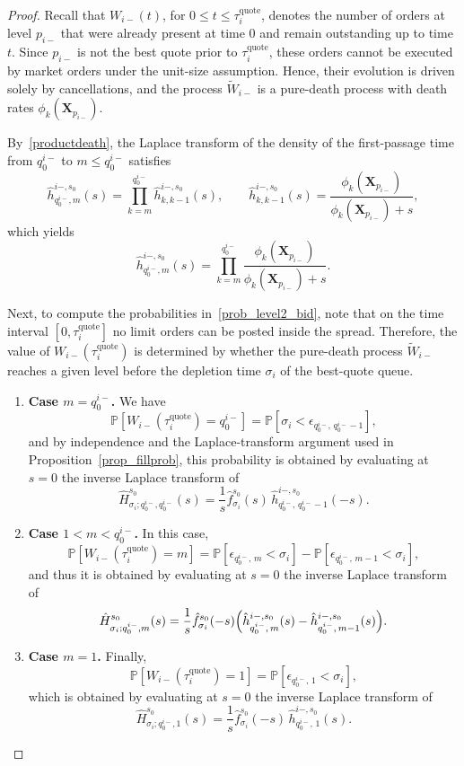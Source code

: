 \documentclass[10pt,a4paper]{amsart}
\begin{document}
\begin{proof}
Recall that $W_{i-}(t)$, for $0\leq t\leq \tau_i^{\text{quote}}$, denotes the number of orders at level $p_{i-}$ that were already present at time $0$ and remain outstanding up to time $t$. Since $p_{i-}$ is not the best quote prior to $\tau_i^{\text{quote}}$, these orders cannot be executed by market orders under the unit-size assumption. Hence, their evolution is driven solely by cancellations, and the process $\tilde{W}_{i-}$ is a pure-death process with death rates $\phi_k(\boldsymbol{X}_{p_{i-}})$.

By~\eqref{productdeath}, the Laplace transform of the density of the first-passage time from $q_0^{i-}$ to $m\leq q_0^{i-}$ satisfies
\[
\hat{h}_{q_0^{i-},m}^{i-,s_0}(s)
=
\prod_{k=m}^{q_0^{i-}}
\hat{h}_{k,k-1}^{i-,s_0}(s),
\qquad
\hat{h}_{k,k-1}^{i-,s_0}(s)
=
\frac{\phi_k(\boldsymbol{X}_{p_{i-}})}{\phi_k(\boldsymbol{X}_{p_{i-}})+s},
\]
which yields
\[
\hat{h}_{q_0^{i-},m}^{i-,s_0}(s)
=
\prod_{k=m}^{q_0^{i-}}
\frac{\phi_k(\boldsymbol{X}_{p_{i-}})}
{\phi_k(\boldsymbol{X}_{p_{i-}})+s}.
\]

Next, to compute the probabilities in~\eqref{prob_level2_bid}, note that on the time interval $[0,\tau_i^{\text{quote}}]$ no limit orders can be posted inside the spread. Therefore, the value of $W_{i-}(\tau_i^{\text{quote}})$ is determined by whether the pure-death process $\tilde{W}_{i-}$ reaches a given level before the depletion time $\sigma_i$ of the best-quote queue.

\begin{enumerate}
\item[\textbf{(i)}]\textbf{Case $m=q_0^{i-}$.}
We have
\[
\mathbb{P}[W_{i-}(\tau_i^{\text{quote}})=q_0^{i-}]
=
\mathbb{P}[\sigma_i<\epsilon_{q_0^{i-},\,q_0^{i-}-1}],
\]
and by independence and the Laplace-transform argument used in Proposition~\ref{prop_fillprob},
this probability is obtained by evaluating at $s=0$ the inverse Laplace transform of
\[
\hat{H}^{s_0}_{\sigma_i; q_0^{i-}, q_0^{i-}}(s)
=
\frac{1}{s}\hat{f}^{s_0}_{\sigma_i}(s)\,
\hat{h}^{i-, s_0}_{q_0^{i-},\,q_0^{i-}-1}(-s).
\]


\item[\textbf{(ii)}]\textbf{Case $1<m<q_0^{i-}$.}
In this case,
\[
\mathbb{P}[W_{i-}(\tau_i^{\text{quote}})=m]
=
\mathbb{P}[\epsilon_{q_0^{i-},\,m}<\sigma_i]
-
\mathbb{P}[\epsilon_{q_0^{i-},\,m-1}<\sigma_i],
\]
and thus it is obtained by evaluating at $s=0$ the inverse Laplace transform of
\[
\hat{H}^{s_0}_{\sigma_i; q_0^{i-}, m}(s)
=
\frac{1}{s}\hat{f}^{s_0}_{\sigma_i}(-s)
\Bigl(
\hat{h}^{i-, s_0}_{q_0^{i-},\,m}(s)
-
\hat{h}^{i-, s_0}_{q_0^{i-},\,m-1}(s)
\Bigr).
\]

\item[\textbf{(iii)}]\textbf{Case $m=1$.}
Finally,
\[
\mathbb{P}[W_{i-}(\tau_i^{\text{quote}})=1]
=
\mathbb{P}[\epsilon_{q_0^{i-},\,1}<\sigma_i],
\]
which is obtained by evaluating at $s=0$ the inverse Laplace transform of
\[
\hat{H}^{s_0}_{\sigma_i; q_0^{i-}, 1}(s)
=
\frac{1}{s}\hat{f}^{s_0}_{\sigma_i}(-s)\,
\hat{h}^{i-, s_0}_{q_0^{i-},\,1}(s).
\]
\end{enumerate}
\end{proof}
\end{document}
